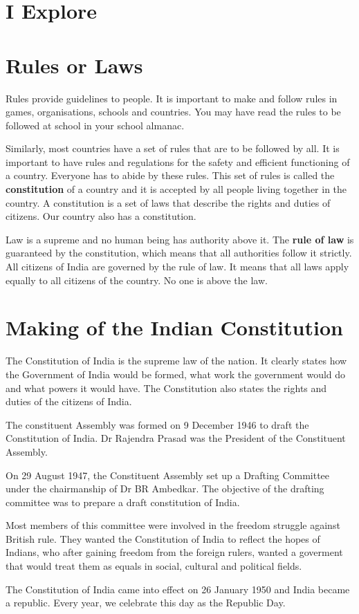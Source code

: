 \section{I Explore}
\section{Rules or Laws}
Rules provide guidelines to people. It is important to make and follow rules in games, organisations, schools and countries. You may have read the rules to be followed at school in your school almanac.
\vspace{0.1in}
\par
Similarly, most countries have a set of rules that are to be followed by all. It is important to have rules and regulations for the safety and efficient functioning of a country. Everyone has to abide by these rules. This set of rules is called the \textbf{constitution} of a country and it is accepted by all people living together in the country. A constitution is a set of laws that describe the rights and duties of citizens. Our country also has a constitution.
\vspace{0.1in}
\par
Law is a supreme and no human being has authority above it. The \textbf{rule of law} is guaranteed by the constitution, which means that all authorities follow it strictly. All citizens of India are governed by the rule of law. It means that all laws apply equally to all citizens of the country. No one is above the law.
\section{Making of the Indian Constitution}
The Constitution of India is the supreme law of the nation. It clearly states how the Government of India would be formed, what work the government would do and what powers it would have. The Constitution also states the rights and duties of the citizens of India.
\vspace{0.1in}
\par
The constituent Assembly was formed on 9 December 1946 to draft the Constitution of India. Dr Rajendra Prasad was the President of the Constituent Assembly.
\vspace{0.1in}
\par
On 29 August 1947, the Constituent Assembly set up a Drafting Committee under the chairmanship of Dr BR Ambedkar. The objective of the drafting committee was to prepare a draft constitution of India.
\vspace{0.1in}
\par
Most members of this committee were involved in the freedom struggle against British rule. They wanted the Constitution of India to reflect the hopes of Indians, who after gaining freedom from the foreign rulers, wanted a goverment that would treat them as equals in social, cultural and political fields.
\vspace{0.1in}
\par
The Constitution of India came into effect on 26 January 1950 and India became a republic. Every year, we celebrate this day as the Republic Day.
\vspace{0.6in}
